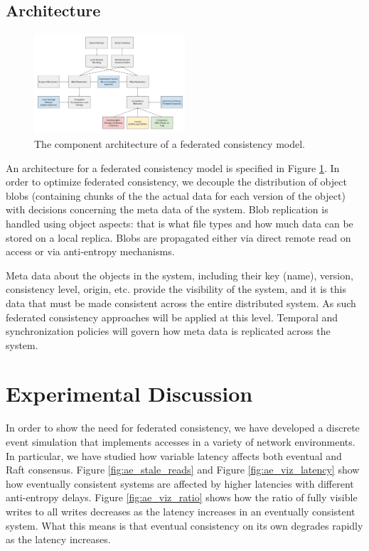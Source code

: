 \documentclass[letterpaper,twocolumn,10pt]{article}
\begin{document}
\subsection{Architecture}

\begin{figure}[h]
    \centering
    \includegraphics[width=0.5\textwidth]{figures/architecture}
    \caption{The component architecture of a federated consistency model.}
    \label{fig:architecture}
\end{figure}

An architecture for a federated consistency model is specified in Figure \ref{fig:architecture}. In order to optimize federated consistency, we decouple the distribution of object blobs (containing chunks of the the actual data for each version of the object) with decisions concerning the meta data of the system. Blob replication is handled using object aspects: that is what file types and how much data can be stored on a local replica. Blobs are propagated either via direct remote read on access or via anti-entropy mechanisms.

Meta data about the objects in the system, including their key (name), version, consistency level, origin, etc. provide the visibility of the system, and it is this data that must be made consistent across the entire distributed system. As such federated consistency approaches will be applied at this level. Temporal and synchronization policies will govern how meta data is replicated across the system.

\section{Experimental Discussion}

In order to show the need for federated consistency, we have developed a discrete event simulation that implements accesses in a variety of network environments. In particular, we have studied how variable latency affects both eventual and Raft consensus. Figure \ref{fig:ae_stale_reads} and Figure \ref{fig:ae_viz_latency} show how eventually consistent systems are affected by higher latencies with different anti-entropy delays. Figure \ref{fig:ae_viz_ratio} shows how the ratio of fully visible writes to all writes decreases as the latency increases in an eventually consistent system. What this means is that eventual consistency on its own degrades rapidly as the latency increases.
\end{document}
